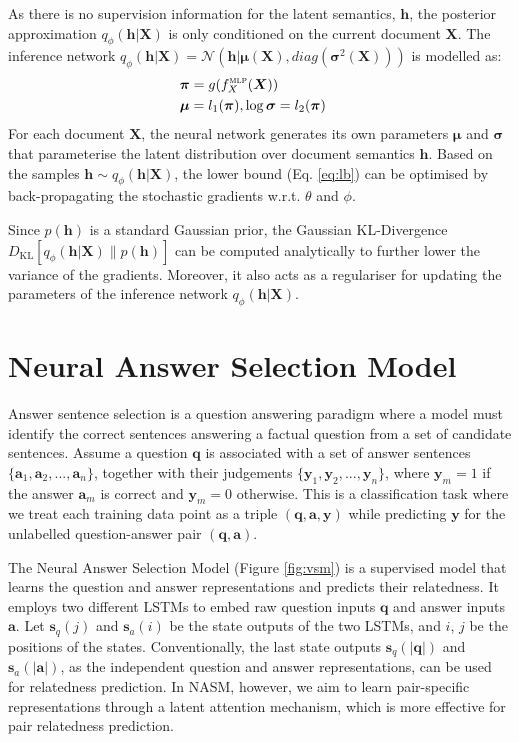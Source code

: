 \documentclass{article}
\newcommand{\tmmathbf}[1]{\ensuremath{\boldsymbol{#1}}}
\newcommand{\tmop}[1]{\ensuremath{\operatorname{#1}}}
\begin{document}
As there is no supervision information for the latent semantics, $\tmmathbf{h}$, the posterior approximation $q_{\phi} ( \tmmathbf{h} | \tmmathbf{X})$ is only conditioned on the current document $\tmmathbf{X}$. 
The inference network $q_{\phi} ( \tmmathbf{h} | \tmmathbf{X})=\mathcal{N} ( \tmmathbf{h} | \tmmathbf{\mu} (\tmmathbf{X}), diag(\tmmathbf{\sigma}^2 (\tmmathbf{X})))$ is modelled as:
\begin{eqnarray}
\label{eq:mlp}
  &\tmmathbf{\pi}  =  g(f^{\textsc{mlp}}_X (\tmmathbf{X})) & \\ 
  &\tmmathbf{\mu}  =  l_1 ( \tmmathbf{\pi}) , 
  \log \tmmathbf{\sigma}  =  l_2 ( \tmmathbf{\pi}) &
\end{eqnarray}
For each document $\tmmathbf{X}$, the neural network generates its own parameters $\tmmathbf{\mu}$ and $\tmmathbf{\sigma}$ that parameterise the latent distribution over document semantics $\tmmathbf{h}$. Based on the samples $\tmmathbf{h} \sim q_{\phi} ( \tmmathbf{h}|\tmmathbf{X})$, the lower bound (Eq. \ref{eq:lb}) can be optimised by back-propagating the stochastic gradients w.r.t. $\theta$ and $\phi$.

Since $p (\tmmathbf{h}  )$ is a standard Gaussian prior, the Gaussian KL-Divergence $D_{\tmop{KL}} [q_{\phi} ( \tmmathbf{h} | \tmmathbf{X})\|p (\tmmathbf{h} )]$ can be computed analytically to further lower the variance of the gradients.
Moreover, it also acts as a regulariser for updating the parameters of the inference network $q_{\phi} ( \tmmathbf{h}| \tmmathbf{X})$.


\section{Neural Answer Selection Model}
Answer sentence selection is a question answering paradigm where a model must identify the correct sentences answering a factual question from a set of candidate sentences. 
Assume a question $\tmmathbf{q}$ is associated with a set of answer sentences $\{\tmmathbf{a}_1,\tmmathbf{a}_2,...,\tmmathbf{a}_n\}$, together with their judgements $\{\tmmathbf{y}_1,\tmmathbf{y}_2,...,\tmmathbf{y}_n\}$, where $\tmmathbf{y}_m=1$ if the answer $\tmmathbf{a}_m$ is correct and $\tmmathbf{y}_m=0$ otherwise. 
This is a classification task where we treat each training data point as a triple $(\tmmathbf{q},\tmmathbf{a},\tmmathbf{y})$ while predicting $\tmmathbf{y}$ for the unlabelled question-answer pair $(\tmmathbf{q},\tmmathbf{a})$.  

The Neural Answer Selection Model (Figure \ref{fig:vsm}) is a supervised model that learns the question and answer representations and predicts their relatedness.
It employs two different LSTMs to embed raw question inputs $\tmmathbf{q}$ and answer inputs $\tmmathbf{a}$. 
Let $\tmmathbf{s}_q (j)$ and $\tmmathbf{s}_a (i)$ be the state outputs of the two LSTMs, and $i$, $j$ be the positions of the states. 
Conventionally, the last state outputs $\tmmathbf{s}_q (| \tmmathbf{q} |)$ and $\tmmathbf{s}_a (|\tmmathbf{a} |)$, as the independent question and answer representations, can be used for relatedness prediction. 
In NASM, however, we aim to learn pair-specific representations through a latent attention mechanism, which is more effective for pair relatedness prediction.
\end{document}
